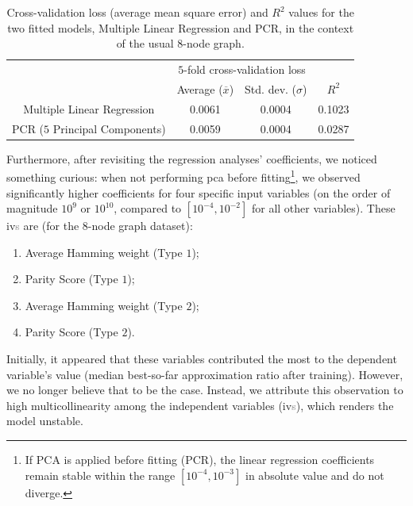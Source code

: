 \begin{table}[H]
  \centering
  \begin{tabular}{|c|cc|c|}
  \hline
  \rowcolor[HTML]{FFFFFF} 
  \cellcolor[HTML]{FFFFFF}                               & \multicolumn{2}{c|}{\cellcolor[HTML]{FFFFFF}$5$-fold cross-validation loss} & \cellcolor[HTML]{FFFFFF} \\ \cline{2-3}
  \rowcolor[HTML]{FFFFFF} 
  \multirow{-2}{*}{\cellcolor[HTML]{FFFFFF}Model ($8$-node graph)} &
    \multicolumn{1}{c|}{\cellcolor[HTML]{FFFFFF}Average ($\overline{x}$)} &
    Std. dev. ($\sigma$) &
    \multirow{-2}{*}{\cellcolor[HTML]{FFFFFF}$R^2$} \\ \hline
  \rowcolor[HTML]{EFEFEF} 
  \cellcolor[HTML]{FFFFFF}Multiple Linear Regression     & \multicolumn{1}{c|}{\cellcolor[HTML]{EFEFEF}0.0061}         & 0.0004        & 0.1023                   \\ \hline
  \rowcolor[HTML]{EFEFEF} 
  \cellcolor[HTML]{FFFFFF}PCR ($5$ Principal Components) & \multicolumn{1}{c|}{\cellcolor[HTML]{EFEFEF}0.0059}         & 0.0004        & 0.0287                   \\ \hline
  \end{tabular}
  \caption{Cross-validation loss (average mean square error) and $R^2$ values for the two fitted models, Multiple Linear Regression and PCR, in the context of the usual $8$-node graph.}
  \label{tab:Scaled_Median_BSF_Table_8-node}
\end{table}

Furthermore, after revisiting the regression analyses' coefficients, we noticed something curious: when not performing \acrshort{pca} before fitting\footnote{If PCA is applied before fitting (PCR), the linear regression coefficients remain stable within the range \([10^{-4}, 10^{-3}]\) in absolute value and do not diverge.}, we observed significantly higher coefficients for four specific input variables (on the order of magnitude \(10^9\) or \(10^{10}\), compared to \([10^{-4}, 10^{-2}]\) for all other variables). These \acrshort{iv}\textcolor{gray}{s} are (for the $8$-node graph dataset):
\begin{enumerate}
    \item Average Hamming weight (Type $1$);
    \item Parity Score (Type $1$);
    \item Average Hamming weight (Type $2$);
    \item Parity Score (Type $2$).
\end{enumerate}
Initially, it appeared that these variables contributed the most to the dependent variable's value (median best-so-far approximation ratio after training). However, we no longer believe that to be the case. Instead, we attribute this observation to high multicollinearity among the independent variables (\acrshort{iv}\textcolor{gray}{s}), which renders the model unstable.

